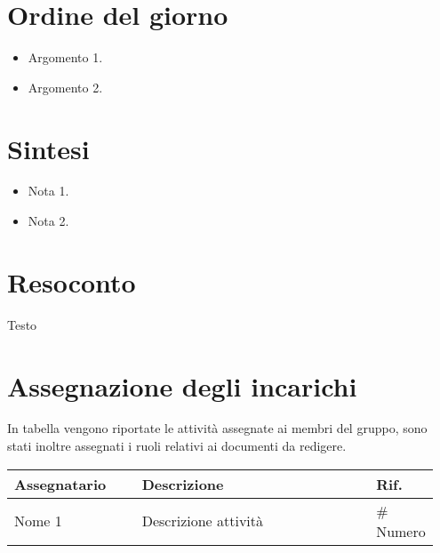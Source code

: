 \section{Ordine del giorno}
\begin{itemize}
    \item Argomento 1.
    \item Argomento 2.
\end{itemize}

\section{Sintesi}
\begin{itemize}
    \item Nota 1.
    \item Nota 2.
\end{itemize}

\section{Resoconto}
Testo

\section{Assegnazione degli incarichi}
In tabella vengono riportate le attività assegnate ai membri del gruppo, sono stati inoltre assegnati i ruoli relativi ai documenti da redigere.
\begin{center}
    {
    \renewcommand{\arraystretch}{1.5}
    \begin{tabular}{p{0.30\linewidth}p{0.55\linewidth}p{0.10\linewidth}}
        \textbf{Assegnatario}    &   \textbf{Descrizione}   & \textbf{Rif.}     \\
        \hline
        Nome 1    & Descrizione attività                    & \# Numero          \\
    \end{tabular}
    }
\end{center}